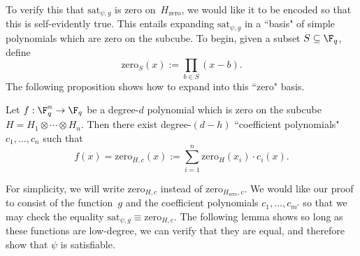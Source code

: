 \documentclass[11pt]{article}
\begin{document}
To verify this that $\mathrm{sat}_{\psi,g}$ is zero on~$H_{\mathrm{zero}}$, we would like it to be encoded so that this is self-evidently true.
This entails expanding $\mathrm{sat}_{\psi,g}$ in a ``basis" of simple polynomials which are zero on the subcube.
To begin, given a subset $S \subseteq \F_q$, define
\begin{equation*}
\mathrm{zero}_S(x) := \prod_{b \in S}(x-b).
\end{equation*}
The following proposition shows how to expand into this ``zero" basis.
\begin{proposition}\label{prop:coefficient-polys}
Let $f:\F_q^{n} \rightarrow \F_q$ be a degree-$d$ polynomial which is zero on the subcube $H = H_1 \otimes \cdots \otimes H_n$. Then there exist degree-$(d-h)$ ``coefficient polynomials" $c_1, \ldots, c_n$ such that
\begin{equation*}
f(x) = \mathrm{zero}_{H,c}(x):= \sum_{i=1}^{n} \mathrm{zero}_H(x_i) \cdot c_i(x).
\end{equation*}
\end{proposition}

For simplicity, we will write $\mathrm{zero}_{H,c}$ instead of $\mathrm{zero}_{H_{\mathrm{zero}},c}$.
We would like our proof to consist of the function~$g$ and the coefficient polynomials $c_1,\ldots, c_{m'}$ so that we may check the equality
$\mathrm{sat}_{\psi,g} \equiv \mathrm{zero}_{H,c}$.
The following lemma shows so long as these functions are low-degree,
we can verify that they are equal, and therefore show that $\psi$ is satisfiable.
\end{document}
